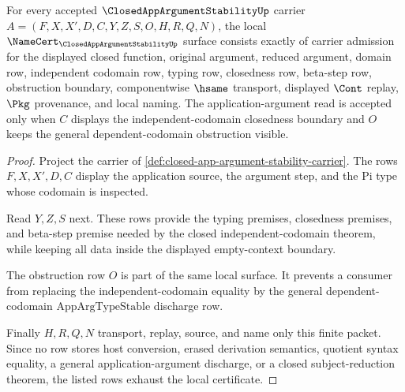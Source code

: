 \begin{theorem}
\label{thm:closed-app-argument-stability-namecert-obligations}
For every accepted $\ClosedAppArgumentStabilityUp$ carrier $A=(F,X,X',D,C,Y,Z,S,O,H,R,Q,N)$, the local $\NameCert_{\ClosedAppArgumentStabilityUp}$ surface consists exactly of carrier admission for the displayed closed function, original argument, reduced argument, domain row, independent codomain row, typing row, closedness row, beta-step row, obstruction boundary, componentwise $\hsame$ transport, displayed $\Cont$ replay, $\Pkg$ provenance, and local naming. The application-argument read is accepted only when $C$ displays the independent-codomain closedness boundary and $O$ keeps the general dependent-codomain obstruction visible.
\end{theorem}
\begin{proof}
Project the carrier of \autoref{def:closed-app-argument-stability-carrier}. The rows $F,X,X',D,C$ display the application source, the argument step, and the Pi type whose codomain is inspected.

Read $Y,Z,S$ next. These rows provide the typing premises, closedness premises, and beta-step premise needed by the closed independent-codomain theorem, while keeping all data inside the displayed empty-context boundary.

The obstruction row $O$ is part of the same local surface. It prevents a consumer from replacing the independent-codomain equality by the general dependent-codomain $\mathrm{AppArgTypeStable}$ discharge row.

Finally $H,R,Q,N$ transport, replay, source, and name only this finite packet. Since no row stores host conversion, erased derivation semantics, quotient syntax equality, a general application-argument discharge, or a closed subject-reduction theorem, the listed rows exhaust the local certificate.
\end{proof}

